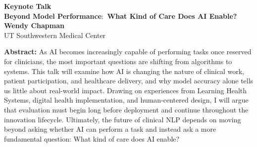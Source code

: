 \documentclass[11pt,oneside]{book}
\begin{document}
  \begin{center}
          {\Large \textbf{Keynote Talk}\\}
      {\LARGE \textbf{Beyond Model Performance$:$ What Kind of Care Does AI Enable?}\\}
        \vspace*{0.5cm}
    \textbf{Wendy Chapman}\\
        UT Southwestern Medical Center\\
        
        
                
  \end{center}

  \vspace*{0.2cm}
    \textbf{Abstract:} As AI becomes increasingly capable of performing tasks once reserved for clinicians, the most important questions are shifting from algorithms to systems. This talk will examine how AI is changing the nature of clinical work, patient participation, and healthcare delivery, and why model accuracy alone tells us little about real-world impact. Drawing on experiences from Learning Health Systems, digital health implementation, and human-centered design, I will argue that evaluation must begin long before deployment and continue throughout the innovation lifecycle. Ultimately, the future of clinical NLP depends on moving beyond asking whether AI can perform a task and instead ask a more fundamental question: What kind of care does AI enable?\\
  \newline
  
\end{document}
